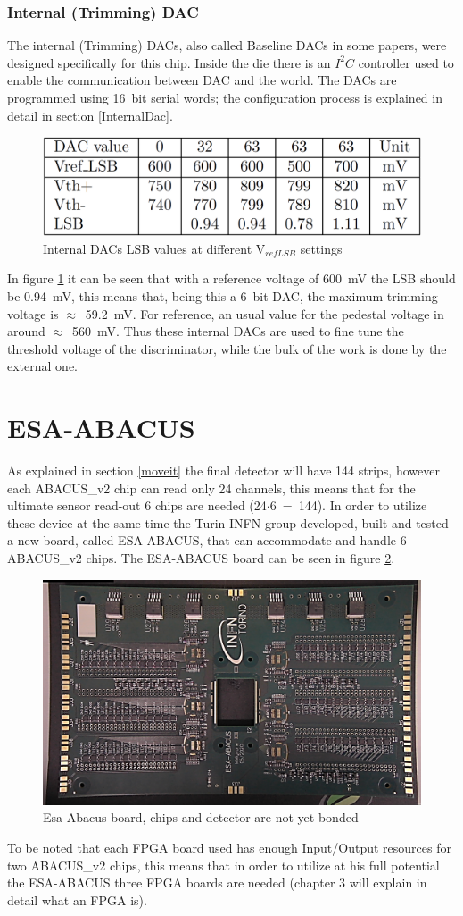 \subsubsection{Internal (Trimming) DAC}
The internal (Trimming) DACs, also called Baseline DACs in some papers, were designed specifically for this chip. Inside the die there is an $I^2C$ controller used to enable the communication between DAC and the world.
The DACs are programmed using 16~bit serial words; the configuration process is explained in detail in section \ref{InternalDac}.
\begin{figure}[H]
	\centering
	\includegraphics[width=0.5\linewidth]{IMG/ch2/INTDACTABLE}
	\caption{Internal DACs LSB values at different V$_{refLSB}$ settings}
	\label{fig:intdactable}
\end{figure}
\noindent In figure \ref{fig:intdactable} it can be seen that with a reference voltage of 600~mV the LSB should be 0.94~mV, this means that, being this a 6~bit DAC, the maximum trimming voltage is $\approx$~59.2~mV. For reference, an usual value for the pedestal voltage in around $\approx$~560~mV. Thus these internal DACs are used to fine tune the threshold voltage of the discriminator, while the bulk of the work is done by the external one.   

\section{ESA-ABACUS}\label{esaabacus}
\noindent As explained in section \ref{moveit} the final detector will have 144 strips, however each ABACUS\_v2 chip can read only 24 channels, this means that for the ultimate sensor read-out 6 chips are needed (24$\cdot$6~=~144).
In order to utilize these device at the same time the Turin INFN group developed, built and tested a new board, called ESA-ABACUS, that can accommodate and handle 6 ABACUS\_v2 chips. The ESA-ABACUS board can be seen in figure \ref{fig:esaabacus}.
\begin{figure}[H]
	\centering
	\includegraphics[width=0.7\linewidth]{IMG/ch2/EsaAbacus.png}
	\caption{Esa-Abacus board, chips and detector are not yet bonded}
	\label{fig:esaabacus}
\end{figure}
\noindent To be noted that each FPGA board used has enough Input/Output resources for two ABACUS\_v2 chips, this means that in order to utilize at his full potential the ESA-ABACUS three FPGA boards are needed (chapter 3 will explain in detail what an FPGA is).


